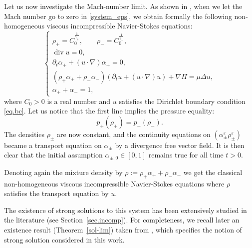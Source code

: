 \documentclass[11pt, twoside, a4paper]{article}
\theoremstyle{plain}
\theoremstyle{remark}
\numberwithin{equation}{section}
\renewcommand{\div}{\operatorname{div}}
\newcommand{\dt}{\partial_t}
\newcommand{\eps}{\varepsilon}
\newcommand{\ap}{\alpha_+}
\newcommand{\am}{\alpha_-}
\newcommand{\rp}{\rho_+}
\newcommand{\rmi}{\rho_-}
\newcommand{\gp}{\gamma_{+}}
\newcommand{\gm}{\gamma_-}
\begin{document}
Let us now investigate the Mach-number limit. As shown in \cite{lebot2025low}, when we let the Mach number go to zero in \eqref{system_eps}, we obtain formally the following non-homogeneous viscous incompressible Navier-Stokes equations:
\begin{equation}\label{limitsys}
 \begin{cases}
 \rp = C_0^{\frac{1}{\gp}},\qquad \rmi = C_0^{\frac{1}{\gm}},\\
 \div u = 0,\\
 \dt \ap + (u \cdot \nabla) \ap =0,\\
 \left(\rp \ap + \rmi \am \right) \left( \dt u + (u \cdot \nabla ) u\right) + \nabla \Pi = \mu \Delta u ,\\
 \ap + \am = 1,
 \end{cases}
\end{equation}
where $C_0>0$ is a real number and $u$ satisfies the Dirichlet boundary condition \eqref{eq.bc}.
Let us notice that the first line implies the pressure equality: 
\[
p_+(\rp)=p_-(\rmi).
\]
The densities $\rho_\pm$ are now constant, and the continuity equations on $(\alpha_\pm^\eps\rho_\pm^\eps)$ became a transport equation on $\alpha_\pm$ by a divergence free vector field. It is then clear that the initial assumption $\alpha_{\pm,0}\in [0,1]$ remains true for all time $t>0$.

Denoting again the mixture density by $\rho:=\rp \ap + \rmi \am$ we get the classical non-homogeneous viscous incompressible Navier-Stokes equations where $\rho$ satisfies the transport equation by $u$.

The existence of strong solutions to this system has been extensively studied in the literature (see Section~\ref{sec.incomp}). For completeness, we recall later an existence result (Theorem~\ref{sol-lim}) taken from \cite{salvi1991equations}, which specifies the notion of strong solution considered in this work.
\end{document}
